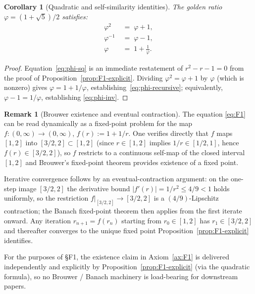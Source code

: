 \documentclass[11pt, a4paper]{amsart}
\newtheorem{corollary}[theorem]{Corollary}
\theoremstyle{definition}
\newtheorem{remark}[theorem]{Remark}
\begin{document}
\begin{corollary}[Quadratic and self-similarity identities]
\label{cor:F1-identities}
The golden ratio $\varphi = (1 + \sqrt{5})/2$ satisfies:
\begin{align}
  \varphi^2 &\;=\; \varphi + 1, \label{eq:phi-sq} \\
  \varphi^{-1} &\;=\; \varphi - 1, \label{eq:phi-inv} \\
  \varphi &\;=\; 1 + \frac{1}{\varphi}. \label{eq:phi-recursive}
\end{align}
\end{corollary}

\begin{proof}
Equation~\eqref{eq:phi-sq} is an immediate restatement of
$r^2 - r - 1 = 0$ from the proof of
Proposition~\ref{prop:F1-explicit}. Dividing $\varphi^2 =
\varphi + 1$ by $\varphi$ (which is nonzero) gives $\varphi
= 1 + 1/\varphi$, establishing~\eqref{eq:phi-recursive};
equivalently, $\varphi - 1 = 1/\varphi$, establishing
\eqref{eq:phi-inv}.
\end{proof}

\begin{remark}[Brouwer existence and eventual contraction]
\label{rmk:F1-banach}
The equation \eqref{eq:F1} can be read dynamically as a
fixed-point problem for the map
$f \colon (0, \infty) \to (0, \infty)$, $f(r) := 1 + 1/r$.
One verifies directly that $f$ maps $[1, 2]$ into $[3/2, 2]
\subset [1, 2]$ (since $r \in [1, 2]$ implies $1/r \in
[1/2, 1]$, hence $f(r) \in [3/2, 2]$), so $f$ restricts to a
continuous self-map of the closed interval $[1, 2]$ and
Brouwer's fixed-point theorem provides existence of a fixed
point.

Iterative convergence follows by an eventual-contraction
argument: on the one-step image $[3/2, 2]$ the derivative
bound $|f'(r)| = 1/r^2 \leq 4/9 < 1$ holds uniformly, so the
restriction $f|_{[3/2, 2]} \to [3/2, 2]$ is a $(4/9)$-Lipschitz
contraction; the Banach fixed-point theorem then applies from
the first iterate onward. Any iteration $r_{n+1} = f(r_n)$
starting from $r_0 \in [1, 2]$ has $r_1 \in [3/2, 2]$ and
thereafter converges to the unique fixed point
Proposition~\ref{prop:F1-explicit} identifies.

For the purposes of \S F1, the existence claim in
Axiom~\ref{ax:F1} is delivered independently and explicitly
by Proposition~\ref{prop:F1-explicit} (via the quadratic
formula), so no Brouwer / Banach machinery is load-bearing
for downstream papers.
\end{remark}
\end{document}
